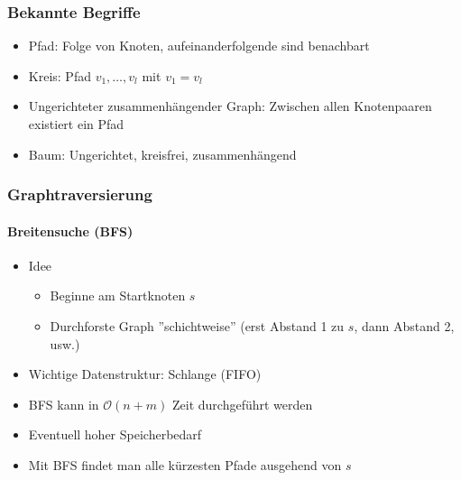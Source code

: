 \documentclass{scrartcl}
\begin{document}
\subsubsection{Bekannte Begriffe}

\begin{itemize}
	\item Pfad: Folge von Knoten, aufeinanderfolgende sind benachbart \\
	
	\item Kreis: Pfad $ v_1,\ldots,v_l $ mit $ v_1=v_l $ \\
	
	\item Ungerichteter zusammenhängender Graph: Zwischen allen Knotenpaaren existiert ein Pfad \\
	
	\item Baum: Ungerichtet, kreisfrei, zusammenhängend \\
	
\end{itemize}

\subsubsection{Graphtraversierung}

\paragraph{Breitensuche (BFS)}

\begin{itemize}
	\item Idee
	\begin{itemize}
		\item Beginne am Startknoten $ s $
		\item Durchforste Graph ''schichtweise'' (erst Abstand 1 zu $ s $, dann Abstand 2, usw.)
	\end{itemize}
	\item Wichtige Datenstruktur: Schlange (FIFO)
	\item BFS kann in $ \mathcal{O}(n+m) $ Zeit durchgeführt werden
	\item Eventuell hoher Speicherbedarf
	\item Mit BFS findet man alle kürzesten Pfade ausgehend von $ s $
\end{itemize}


\end{document}
